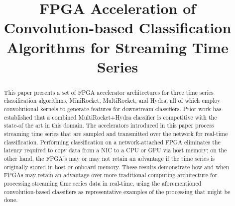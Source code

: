 \documentclass[conference]{IEEEtran}
\begin{document}
\newcommand{\eg}{\emph{e.g.,} }
\newcommand{\ie}{\emph{i.e.,} }

\newcommand{\pb}[1]{\textcolor{blue}{[PB:~#1]}}
\newcommand{\py}[1]{\textcolor{orange}{[PY:~#1]}}
\newcommand{\todo}[1]{\textcolor{purple}{[Todo:~#1]}}



\title{FPGA Acceleration of Convolution-based Classification Algorithms for Streaming Time Series}


\maketitle

\begin{abstract}
This paper presents a set of FPGA accelerator architectures for three time series classification algorithms, MiniRocket, MultiRocket, and Hydra, all of which employ convolutional kernels to generate features for downstream classifiers. Prior work has established that a combined MultiRocket+Hydra classifier is competitive with the state-of the art in this domain. The accelerators introduced in this paper process streaming time series that are sampled and transmitted over the network for real-time classification. Performing classification on a network-attached FPGA eliminates the latency required to copy data from a NIC to a CPU or GPU via host memory; on the other hand, the FPGA's may or may not retain an advantage if the time series is originally stored in host or onboard memory. These results demonstrate how and when FPGAs may retain an advantage over more traditional computing architecture for processing streaming time series data in real-time, using the aforementioned convolution-based classifiers as representative examples of the processing that might be done. 
\end{abstract}











\end{document}
